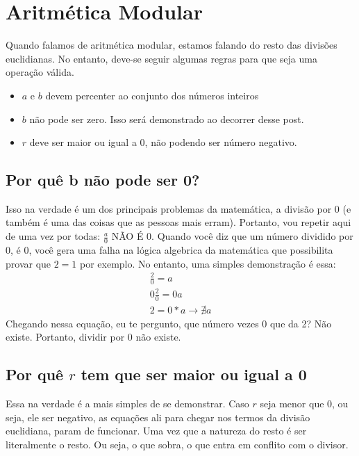 \documentclass[12pt]{article}
\begin{document}
    \section{Aritmética Modular}
    Quando falamos de aritmética modular, estamos falando do resto das divisões euclidianas. No entanto, deve-se seguir algumas regras para que seja uma operação válida.
    \begin{itemize}
        \item $a$ e $b$ devem percenter ao conjunto dos números inteiros
        \item $b$ não pode ser zero. Isso será demonstrado ao decorrer desse post.
        \item $r$ deve ser maior ou igual a 0, não podendo ser número negativo.
    \end{itemize}

    \subsection{Por quê b não pode ser 0?}
    Isso na verdade é um dos principais problemas da matemática, a divisão por 0 (e também é uma das coisas que as pessoas mais erram). Portanto, vou repetir aqui de uma vez por todas: {$\frac{a}{0}$ NÃO É 0}. Quando você diz que um número dividido por 0, é 0, você gera uma falha na lógica algebrica da matemática que possibilita provar que $2 = 1$ por exemplo. No entanto, uma simples demonstração é essa:
    \begin{equation}
        \begin{split}
            \frac{2}{0} = a\\
            0\frac{2}{0} = 0a\\
            2 = 0*a \to \nexists a
        \end{split}
    \end{equation}
    Chegando nessa equação, eu te pergunto, que número vezes 0 que da 2? Não existe. Portanto, dividir por 0 não existe.
    \subsection{Por quê $r$ tem que ser maior ou igual a 0}
    Essa na verdade é a mais simples de se demonstrar. Caso $r$ seja menor que 0, ou seja, ele ser negativo, as equações ali para chegar nos termos da divisão euclidiana, param de funcionar. Uma vez que a natureza do resto é ser literalmente o resto. Ou seja, o que sobra, o que entra em conflito com o divisor.
\end{document}
